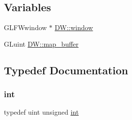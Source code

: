 \subsection*{Variables}
\begin{DoxyCompactItemize}
\item 
G\+L\+F\+Wwindow $\ast$ \mbox{\hyperlink{namespace_d_w_aab8c3528b21e62a229edce918c005236}{D\+W\+::window}}
\item 
G\+Luint \mbox{\hyperlink{namespace_d_w_a888297366f850dc6344c0d54c57550c7}{D\+W\+::map\+\_\+buffer}}
\end{DoxyCompactItemize}


\subsection{Typedef Documentation}
\mbox{\label{draw_8hh_aa620a13339ac3a1177c86edc549fda9b}} 
\subsubsection{\texorpdfstring{int}{int}}
{\footnotesize\ttfamily typedef uint unsigned \mbox{\hyperlink{draw_8hh_aa620a13339ac3a1177c86edc549fda9b}{int}}}

